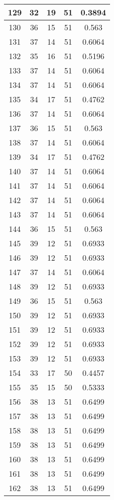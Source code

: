 \documentclass[letterpaper, 12pt]{article}
\begin{document}
\begin{longtable}{|c|c|c|c|c|}
\hline
129 & 32 & 19 & 51 & 0.3894 \\
\hline
130 & 36 & 15 & 51 & 0.563 \\
\hline
131 & 37 & 14 & 51 & 0.6064 \\
\hline
132 & 35 & 16 & 51 & 0.5196 \\
\hline
133 & 37 & 14 & 51 & 0.6064 \\
\hline
134 & 37 & 14 & 51 & 0.6064 \\
\hline
135 & 34 & 17 & 51 & 0.4762 \\
\hline
136 & 37 & 14 & 51 & 0.6064 \\
\hline
137 & 36 & 15 & 51 & 0.563 \\
\hline
138 & 37 & 14 & 51 & 0.6064 \\
\hline
139 & 34 & 17 & 51 & 0.4762 \\
\hline
140 & 37 & 14 & 51 & 0.6064 \\
\hline
141 & 37 & 14 & 51 & 0.6064 \\
\hline
142 & 37 & 14 & 51 & 0.6064 \\
\hline
143 & 37 & 14 & 51 & 0.6064 \\
\hline
144 & 36 & 15 & 51 & 0.563 \\
\hline
145 & 39 & 12 & 51 & 0.6933 \\
\hline
146 & 39 & 12 & 51 & 0.6933 \\
\hline
147 & 37 & 14 & 51 & 0.6064 \\
\hline
148 & 39 & 12 & 51 & 0.6933 \\
\hline
149 & 36 & 15 & 51 & 0.563 \\
\hline
150 & 39 & 12 & 51 & 0.6933 \\
\hline
151 & 39 & 12 & 51 & 0.6933 \\
\hline
152 & 39 & 12 & 51 & 0.6933 \\
\hline
153 & 39 & 12 & 51 & 0.6933 \\
\hline
154 & 33 & 17 & 50 & 0.4457 \\
\hline
155 & 35 & 15 & 50 & 0.5333 \\
\hline
156 & 38 & 13 & 51 & 0.6499 \\
\hline
157 & 38 & 13 & 51 & 0.6499 \\
\hline
158 & 38 & 13 & 51 & 0.6499 \\
\hline
159 & 38 & 13 & 51 & 0.6499 \\
\hline
160 & 38 & 13 & 51 & 0.6499 \\
\hline
161 & 38 & 13 & 51 & 0.6499 \\
\hline
162 & 38 & 13 & 51 & 0.6499 \\

\end{longtable}
\end{document}
